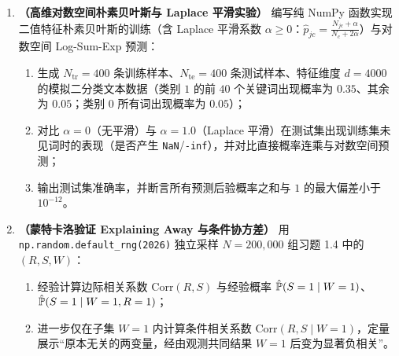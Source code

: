 \begin{enumerate}[label=\textbf{1.\arabic*}, leftmargin=2.4em, resume]
  \item \textbf{（高维对数空间朴素贝叶斯与 Laplace 平滑实验）} 编写纯 NumPy 函数实现二值特征朴素贝叶斯的训练（含 Laplace 平滑系数 $\alpha \ge 0$：$\hat{p}_{jc} = \frac{N_{jc} + \alpha}{N_c + 2\alpha}$）与对数空间 Log-Sum-Exp 预测：
  \begin{enumerate}[label=(\arabic*), leftmargin=1.8em]
    \item 生成 $N_{\text{tr}}=400$ 条训练样本、$N_{\text{te}}=400$ 条测试样本、特征维度 $d=4000$ 的模拟二分类文本数据（类别 $1$ 的前 $40$ 个关键词出现概率为 $0.35$、其余为 $0.05$；类别 $0$ 所有词出现概率为 $0.05$）；
    \item 对比 $\alpha = 0$（无平滑）与 $\alpha = 1.0$（Laplace 平滑）在测试集出现训练集未见词时的表现（是否产生 \texttt{NaN}/\texttt{-inf}），并对比直接概率连乘与对数空间预测；
    \item 输出测试集准确率，并断言所有预测后验概率之和与 $1$ 的最大偏差小于 $10^{-12}$。
  \end{enumerate}
  \par\smallskip{}

  \item \textbf{（蒙特卡洛验证 Explaining Away 与条件协方差）} 用 \texttt{np.random.default\_rng(2026)} 独立采样 $N = 200{,}000$ 组习题 1.4 中的 $(R, S, W)$：
  \begin{enumerate}[label=(\arabic*), leftmargin=1.8em]
    \item 经验计算边际相关系数 $\mathrm{Corr}(R, S)$ 与经验概率 $\hat{\mathbb{P}}(S=1 \mid W=1)$、$\hat{\mathbb{P}}(S=1 \mid W=1, R=1)$；
    \item 进一步仅在子集 $W = 1$ 内计算条件相关系数 $\mathrm{Corr}(R, S \mid W=1)$，定量展示“原本无关的两变量，经由观测共同结果 $W=1$ 后变为显著负相关”。
  \end{enumerate}
  \par\smallskip{}
\end{enumerate}
